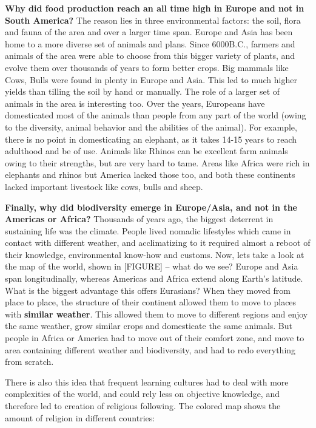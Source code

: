 \textbf{Why did food production reach an all time high in Europe and not in South America?} The reason lies in three environmental factors: the soil, flora and fauna of the area and over a larger time span. Europe and Asia has been home to a more diverse set of animals and plans. Since 6000B.C., farmers and animals of the area were able to choose from this bigger variety of plants, and evolve them over thousands of years to form better crops. Big mammals like Cows, Bulls were found in plenty in Europe and Asia. This led to much higher yields than tilling the soil by hand or manually. The role of a larger set of animals in the area is interesting too. Over the years, Europeans have domesticated most of the animals than people from any part of the world (owing to the diversity, animal behavior and the abilities of the animal). For example, there is no point in domesticating an elephant, as it takes 14-15 years to reach adulthood and be of use. Animals like Rhinos can be excellent farm animals owing to their strengths, but are very hard to tame. Areas like Africa were rich in elephants and rhinos but America lacked those too, and both these continents lacked important livestock like cows, bulls and sheep.

\textbf{Finally, why did biodiversity emerge in Europe/Asia, and not in the Americas or Africa?} Thousands of years ago, the biggest deterrent in sustaining life was the climate. People lived nomadic lifestyles which came in contact with different weather, and acclimatizing to it required almost a reboot of their knowledge, environmental know-how and customs. Now, lets take a look at the map of the world, shown in [FIGURE] -- what do we see? Europe and Asia span longitudinally, whereas Americas and Africa extend along Earth's latitude. What is the biggest advantage this offers Eurasians? When they moved from place to place, the structure of their continent allowed them to move to places with \textbf{similar weather}. This allowed them to move to different regions and enjoy the same weather, grow similar crops and domesticate the same animals. But people in Africa or America had to move out of their comfort zone, and move to area containing different weather and biodiversity, and had to redo everything from scratch. 

There is also this idea that frequent learning cultures had to deal with more complexities of the world, and could rely less on objective knowledge, and therefore led to creation of religious following. The colored map shows the amount of religion in different countries:

